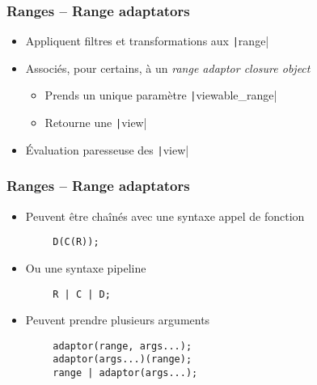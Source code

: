 \documentclass[C++.tex]{subfiles}
\begin{document}
\begin{frame}[fragile]
	\frametitle{Ranges -- Range adaptators}
	\begin{itemize}
		\item Appliquent filtres et transformations aux \texttt|range|
		\item Associés, pour certains, à un \textit{range adaptor closure object}
		\begin{itemize}
			\item Prends un unique paramètre \texttt|viewable_range|
			\item Retourne une \texttt|view|
		\end{itemize}
		\item Évaluation paresseuse des \texttt|view|
	\end{itemize}
\end{frame}

\begin{frame}[fragile]
	\frametitle{Ranges -- Range adaptators}
	\begin{itemize}
		\item Peuvent être chaînés avec une syntaxe \og appel de fonction\fg{}
	\end{itemize}

	\begin{verbatim}
		D(C(R));
	\end{verbatim}

	\begin{itemize}
		\item Ou une syntaxe \og pipeline\fg{}
	\end{itemize}

	\begin{verbatim}
		R | C | D;
	\end{verbatim}

	\begin{itemize}
		\item Peuvent prendre plusieurs arguments

	\end{itemize}

	\begin{verbatim}
		adaptor(range, args...);
		adaptor(args...)(range);
		range | adaptor(args...);
	\end{verbatim}

\end{frame}
\end{document}
